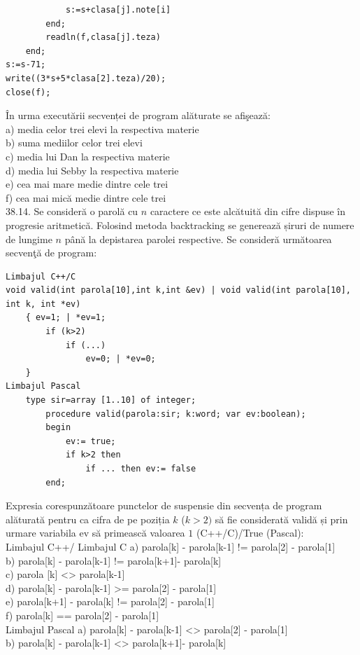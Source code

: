 \begin{itemize}
\begin{enumerate}
\begin{verbatim}
            s:=s+clasa[j].note[i]
        end;
        readln(f,clasa[j].teza)
    end;
s:=s-71;
write((3*s+5*clasa[2].teza)/20);
close(f);
\end{verbatim}
În urma executării secvenței de program alăturate se afişează:
\\
a) media celor trei elevi la respectiva materie
\\
b) suma mediilor celor trei elevi
\\
c) media lui Dan la respectiva materie
\\
d) media lui Sebby la respectiva materie
\\
e) cea mai mare medie dintre cele trei
\\
f) cea mai mică medie dintre cele trei
\\
38.14. Se consideră o parolă cu $n$ caractere ce este alcătuită din cifre dispuse în progresie aritmetică. Folosind metoda backtracking se generează șiruri de numere de lungime $n$ până la depistarea parolei respective. Se consideră următoarea secvenţă de program:
\begin{verbatim}
Limbajul C++/C
void valid(int parola[10],int k,int &ev) | void valid(int parola[10], int k, int *ev)
    { ev=1; | *ev=1;
        if (k>2)
            if (...)
                ev=0; | *ev=0;
    }
Limbajul Pascal
    type sir=array [1..10] of integer;
        procedure valid(parola:sir; k:word; var ev:boolean);
        begin
            ev:= true;
            if k>2 then
                if ... then ev:= false
        end;
\end{verbatim}
Expresia corespunzătoare punctelor de suspensie din secvența de program alăturată pentru ca cifra de pe poziția $k$ ($k>2)$ să fie considerată validă și prin urmare variabila ev să primească valoarea $1$ (C++/C)/True (Pascal):
\\
Limbajul C++/ Limbajul C
a) parola[k] - parola[k-1] != parola[2] - parola[1]
\\
b) parola[k] - parola[k-1] != parola[k+1]- parola[k]
\\
c) parola [k] <> parola[k-1]
\\
d) parola[k] - parola[k-1] >= parola[2] - parola[1]
\\
e) parola[k+1] - parola[k] != parola[2] - parola[1]
\\
f) parola[k] == parola[2] - parola[1]
\\
Limbajul Pascal
a) parola[k] - parola[k-1] <> parola[2] - parola[1]
\\
b) parola[k] - parola[k-1] <> parola[k+1]- parola[k]
\\

\end{enumerate}
\end{itemize}
